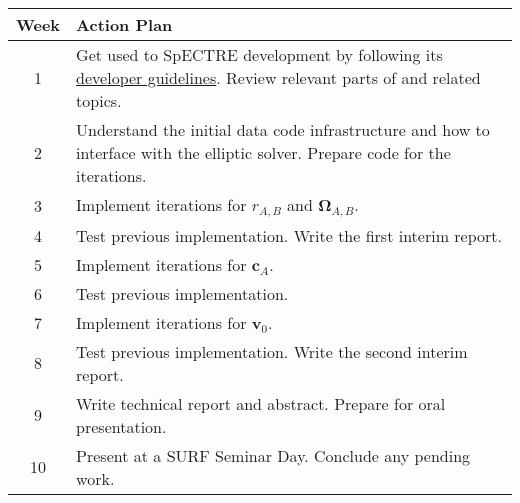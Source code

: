 \documentclass{../letter}
\renewcommand{\v}[1]{\boldsymbol{#1}}
\begin{document}
	\begin{center}
		\setlength{\tabcolsep}{0.5cm}
		\def\arraystretch{1.5}
		\begin{tabular}{cp{}}
			\hline
			\textbf{Week} & \textbf{Action Plan} \\ \hline
			1 & Get used to SpECTRE development by following its \href{https://spectre-code.org/dev_guide.html}{developer guidelines}. Review relevant parts of \cite{Serguei} and related topics. \\
			2 & Understand the initial data code infrastructure and how to interface with the elliptic solver. Prepare code for the iterations. \\
			3 & Implement iterations for $r_{A,B}$ and $\v \Omega_{A,B}$. \\
			4 & Test previous implementation. Write the first interim report. \\
			5 & Implement iterations for $\v c_A$. \\
			6 & Test previous implementation. \\
			7 & Implement iterations for $\v v_0$. \\
			8 & Test previous implementation. Write the second interim report. \\
			9 & Write technical report and abstract. Prepare for oral presentation. \\
			10 & Present at a SURF Seminar Day. Conclude any pending work. \\ \hline
		\end{tabular}
	\end{center}

	\printbibliography
\end{document}
